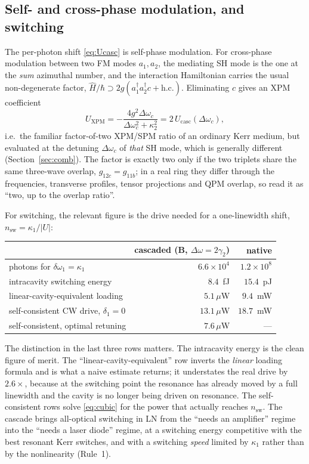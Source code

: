 \documentclass[11pt,a4paper]{article}
\newcommand{\Dom}{\Delta\omega}
\newcommand{\Ucasc}{U_{\text{casc}}}
\begin{document}
\subsection{Self- and cross-phase modulation, and switching}

The per-photon shift \eqref{eq:Ucasc} is self-phase modulation.  For
cross-phase modulation between two FM modes $a_1,a_2$, the mediating SH
mode is the one at the \emph{sum} azimuthal number, and the interaction
Hamiltonian carries the usual non-degenerate factor,
$\hat H/\hbar\supset2g(a_1^\dagger a_2^\dagger c+\text{h.c.})$.
Eliminating $c$ gives an XPM coefficient
\begin{equation}
  U_{\text{XPM}}=-\frac{4g^2\Dom_c}{\Dom_c^2+\kappa_2^2}=2\,\Ucasc(\Dom_c),
\end{equation}
i.e.\ the familiar factor-of-two XPM/SPM ratio of an ordinary Kerr
medium, but evaluated at the detuning $\Dom_c$ of \emph{that} SH mode,
which is generally different (Section~\ref{sec:comb}).  The factor is
exactly two only if the two triplets share the same three-wave overlap,
$g_{12c}=g_{11b}$; in a real ring they differ through the frequencies,
transverse profiles, tensor projections and QPM overlap, so read it as
``two, up to the overlap ratio''.

For switching, the relevant figure is the drive needed for a
one-linewidth shift, $n_{\text{sw}}=\kappa_1/|U|$:
\begin{center}
\small
\begin{tabular}{lrr}
\toprule
 & cascaded (B, $\Dom=2\gamma_2$) & native \\
\midrule
photons for $\delta\omega_1=\kappa_1$ & $6.6\times10^4$ & $1.2\times10^8$\\
intracavity switching energy          & $8.4$~fJ        & $15.4$~pJ\\
linear-cavity-equivalent loading      & $5.1\,\mu$W     & $9.4$~mW\\
self-consistent CW drive, $\delta_1=0$& $13.1\,\mu$W    & $18.7$~mW\\
self-consistent, optimal retuning     & $7.6\,\mu$W     & ---\\
\bottomrule
\end{tabular}
\end{center}
The distinction in the last three rows matters.  The intracavity energy
is the clean figure of merit.  The ``linear-cavity-equivalent'' row
inverts the \emph{linear} loading formula and is what a naive estimate
returns; it understates the real drive by $2.6\times$, because at the
switching point the resonance has already moved by a full linewidth and
the cavity is no longer being driven on resonance.  The self-consistent
rows solve \eqref{eq:cubic} for the power that actually reaches
$n_{\text{sw}}$.
The cascade brings all-optical switching in LN from the ``needs an
amplifier'' regime into the ``needs a laser diode'' regime, at a
switching energy competitive with the best resonant Kerr switches, and
with a switching \emph{speed} limited by $\kappa_1$ rather than by the
nonlinearity (Rule~1).
\end{document}
